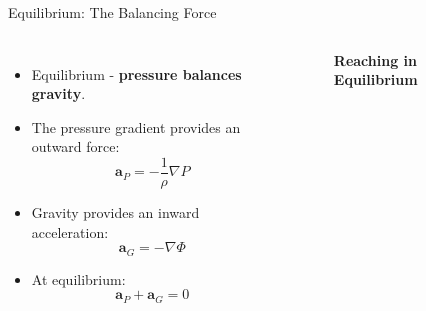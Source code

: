 \documentclass{beamer}
\begin{document}
    \begin{frame}{Equilibrium: The Balancing Force}   	
    	\begin{columns}[c]    		
    		\begin{itemize}
    			\item Equilibrium - \textbf{pressure balances gravity}.    			
    			\item The pressure gradient provides an outward force:
    			\[
    			\mathbf{a}_{P}
    			=-\frac{1}{\rho}\nabla P
    			\]    			
    			\item Gravity provides an inward acceleration:
    			\[
    			\mathbf{a}_{G}=-\nabla\Phi
    			\]   			
    			\item At equilibrium:
    			\[
    			\boxed{\mathbf{a}_{P}+\mathbf{a}_{G}=0}
    			\]
    		\end{itemize}    		
    		\centering
    		\begin{figure}
    			\centering
    			\caption*{\tiny \textbf{Reaching in Equilibrium}}
    		\end{figure}    		
    	\end{columns}    	
    \end{frame}    
\end{document}
